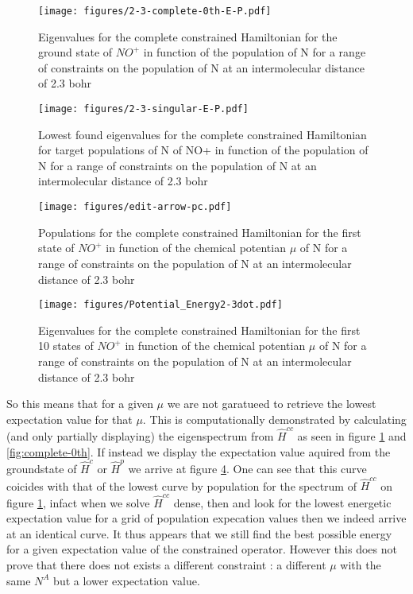\begin{figure}[h!]
  \texttt{[image: figures/2-3-complete-0th-E-P.pdf]}
  \caption{Eigenvalues for the complete constrained Hamiltonian for the ground state of $NO^+$ in function of the population of N for a range of constraints on the population of N at an intermolecular distance of 2.3 bohr}
  \label{fig:complete}
\end{figure}

\begin{figure}[h!]
  \texttt{[image: figures/2-3-singular-E-P.pdf]}
  \caption{Lowest found eigenvalues for the complete constrained Hamiltonian for target populations of N of NO+ in function of the population of N for a range of constraints on the population of N at an intermolecular distance of 2.3 bohr}
  \label{fig:singular}
\end{figure}

\begin{figure}[h!]
  \texttt{[image: figures/edit-arrow-pc.pdf]}
  \caption{Populations for the complete constrained Hamiltonian for the first state of $NO^+$ in function of the chemical potentian $\mu$ of N for a range of constraints on the population of N at an intermolecular distance of 2.3 bohr}
  \label{fig:singular}
\end{figure}


\begin{figure}[h!]
  \texttt{[image: figures/Potential\_Energy2-3dot.pdf]}
  \caption{Eigenvalues for the complete constrained Hamiltonian for the first 10 states of $NO^+$ in function of the chemical potentian $\mu$ of N for a range of constraints on the population of N at an intermolecular distance of 2.3 bohr}
  \label{fig:singular}
\end{figure}

So this means that for a given $\mu$ we are not garatueed to retrieve the lowest expectation value for that $\mu$.
This is computationally demonstrated by calculating (and only partially displaying) the eigenspectrum from $\hat{H}^{cc}$ as seen in figure \ref{fig:complete} and \ref{fig:complete-0th}.
If instead we display the expectation value aquired from the groundstate of $\hat{H}^c$ or $\hat{H}^p$ we arrive at figure \ref{fig:singular}. One can see that  this curve coicides with that of the lowest curve by population for the spectrum of $\hat{H}^{cc}$ on figure \ref{fig:complete}, infact when we solve $\hat{H}^{cc}$ dense, then and look for the lowest energetic expectation value for a grid of population expecation values then we indeed arrive at an identical curve. It thus appears that we still find the best possible energy for a given expectation value of the constrained operator. However this does not prove that there does not exists a different constraint : a different $\mu$ with the same $N^A$ but a lower expectation value.

